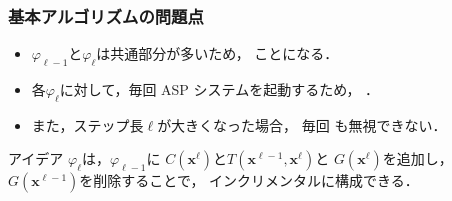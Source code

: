 \documentclass[dvipdfmx,11pt]{beamer}
\begin{document}
\begin{frame}\frametitle{基本アルゴリズムの問題点}

  
  \begin{itemize}
  \item $\varphi_{\ell-1}$と$\varphi_{\ell}$は共通部分が多いため，
    ことになる．
  \item 各$\varphi_\ell$に対して，毎回 ASP システムを起動するため，
    ．
  \item また，ステップ長$\ell$が大きくなった場合，
    毎回 も無視できない．
  \end{itemize}

  \begin{alertblock}{アイデア}\centering
    $\varphi_{\ell}$は，$\varphi_{\ell-1}$に
    $C(\bm{x}^{\ell})$と$T(\bm{x}^{\ell-1},\bm{x}^{\ell})$と
    $G(\bm{x}^{\ell})$を追加し，$G(\bm{x}^{\ell-1})$を削除することで，
    インクリメンタルに構成できる．    
  \end{alertblock}
\end{frame}
\end{document}

